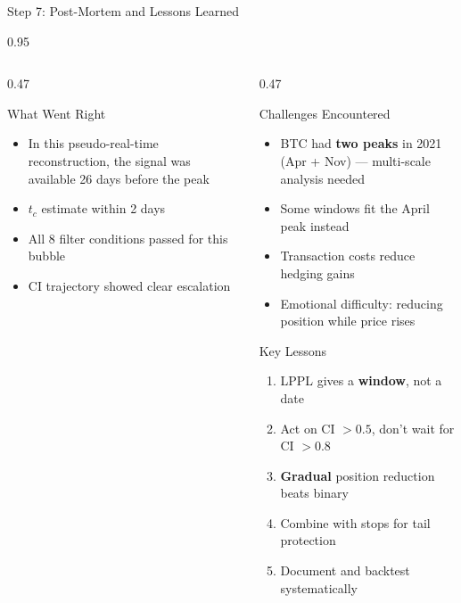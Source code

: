 \documentclass[9pt, aspectratio=169, t]{beamer}
\begin{document}
\begin{frame}{Step 7: Post-Mortem and Lessons Learned}
\begin{cminipage}{0.95\textwidth}
{\begin{columns}[T]
\begin{column}{0.47\textwidth}
            \begin{exampleblock}{What Went Right}
                \begin{itemize}\setlength{\itemsep}{0pt}
                    \item In this pseudo-real-time reconstruction, the signal was available 26 days before the peak
                    \item $t_c$ estimate within 2 days
                    \item All 8 filter conditions passed for this bubble
                    \item CI trajectory showed clear escalation
                \end{itemize}
            \end{exampleblock}
        \end{column}
        \begin{column}{0.47\textwidth}
            \begin{alertblock}{Challenges Encountered}
                \begin{itemize}\setlength{\itemsep}{1pt}
                    \item BTC had \textbf{two peaks} in 2021 (Apr + Nov) --- multi-scale analysis needed
                    \item Some windows fit the April peak instead
                    \item Transaction costs reduce hedging gains
                    \item Emotional difficulty: reducing position while price rises
                \end{itemize}
            \end{alertblock}

            \begin{block}{Key Lessons}
                \begin{enumerate}\setlength{\itemsep}{0pt}
                    \item LPPL gives a \textbf{window}, not a date
                    \item Act on CI $> 0.5$, don't wait for CI $> 0.8$
                    \item \textbf{Gradual} position reduction beats binary
                    \item Combine with stops for tail protection
                    \item Document and backtest systematically
                \end{enumerate}
            \end{block}
        \end{column}
    \end{columns}
    }
    \end{cminipage}
\end{frame}
\end{document}
